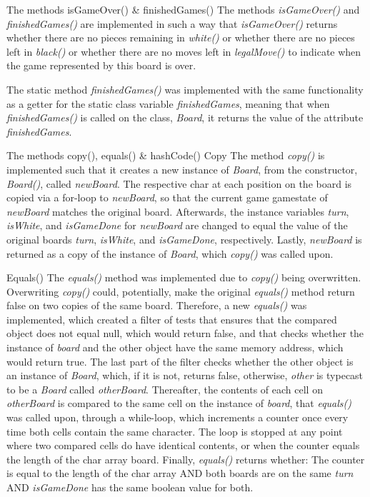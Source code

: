 \documentclass[12pt, a4paper]{article}
\begin{document}
The methods isGameOver() \& finishedGames()
The methods \emph{isGameOver()} and \emph{finishedGames()} are implemented in such a way that \emph{isGameOver()} returns whether there are no pieces remaining in \emph{white()} or whether there are no pieces left in \emph{black()} or whether there are no moves left in \emph{legalMove()} to indicate when the game represented by this board is over. \par
The static method \emph{finishedGames()} was implemented with the same functionality as a getter for the static class variable \emph{finishedGames}, meaning that when \emph{finishedGames()} is called on the class, \emph{Board}, it returns the value of the attribute \emph{finishedGames}.

The methods copy(), equals() \& hashCode()
Copy
The method \emph{copy()} is implemented such that it creates a new instance of \emph{Board}, from the constructor, \emph{Board()}, called \emph{newBoard}. The respective char at each position on the board is copied via a for-loop to \emph{newBoard}, so that the current game gamestate of \emph{newBoard} matches the original board. Afterwards, the instance variables \emph{turn}, \emph{isWhite}, and \emph{isGameDone} for \emph{newBoard} are changed to equal the value of the original boards \emph{turn}, \emph{isWhite}, and \emph{isGameDone}, respectively. Lastly, \emph{newBoard} is returned as a copy of the instance of \emph{Board}, which \emph{copy()} was called upon. \par

Equals()
The \emph{equals()} method was implemented due to \emph{copy()} being overwritten. Overwriting \emph{copy()} could, potentially, make the original \emph{equals()} method return false on two copies of the same board. Therefore, a new \emph{equals()} was implemented, which created a filter of tests that ensures that the compared object does not equal null, which would return false, and that checks whether the instance of \emph{board} and the other object have the same memory address, which would return true. The last part of the filter checks whether the other object is an instance of \emph{Board}, which, if it is not, returns false, otherwise, \emph{other} is typecast to be a \emph{Board} called \emph{otherBoard}. Thereafter, the contents of each cell on \emph{otherBoard} is compared to the same cell on the instance of \emph{board}, that \emph{equals()} was called upon, through a while-loop, which increments a counter once every time both cells contain the same character. The loop is stopped at any point where two compared cells do have identical contents, or when the counter equals the length of the char array board. Finally, \emph{equals()} returns whether: The counter is equal to the length of the char array AND both boards are on the same \emph{turn} AND \emph{isGameDone} has the same boolean value for both.
\end{document}

